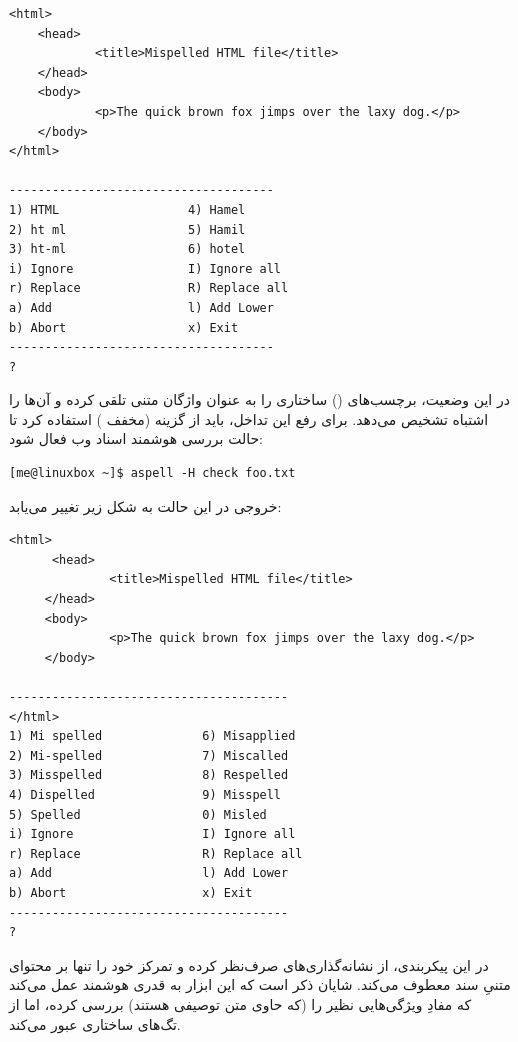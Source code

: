 \begin{latin}
\begin{lstlisting}
<html>
    <head>
            <title>Mispelled HTML file</title>
    </head>
    <body>
            <p>The quick brown fox jimps over the laxy dog.</p>
    </body>
</html>

-------------------------------------
1) HTML                  4) Hamel
2) ht ml                 5) Hamil
3) ht-ml                 6) hotel
i) Ignore                I) Ignore all
r) Replace               R) Replace all
a) Add                   l) Add Lower
b) Abort                 x) Exit
-------------------------------------
?
\end{lstlisting}
\end{latin}

در این وضعیت،  برچسب‌های () ساختاری  را به عنوان واژگان متنی تلقی کرده و آن‌ها را اشتباه تشخیص می‌دهد. برای رفع این تداخل، باید از گزینه  (مخفف ) استفاده کرد تا حالت بررسی هوشمند اسناد وب فعال شود:

\begin{latin}
\begin{lstlisting}
[me@linuxbox ~]$ aspell -H check foo.txt
\end{lstlisting}
\end{latin}

خروجی در این حالت به شکل زیر تغییر می‌یابد:

\begin{latin}
\begin{lstlisting}
<html>
      <head>
              <title>Mispelled HTML file</title>
     </head>
     <body>
              <p>The quick brown fox jimps over the laxy dog.</p>
     </body>

---------------------------------------
</html>
1) Mi spelled              6) Misapplied
2) Mi-spelled              7) Miscalled
3) Misspelled              8) Respelled
4) Dispelled               9) Misspell
5) Spelled                 0) Misled
i) Ignore                  I) Ignore all
r) Replace                 R) Replace all
a) Add                     l) Add Lower
b) Abort                   x) Exit
---------------------------------------
?
\end{lstlisting}
\end{latin}

در این پیکربندی،  از نشانه‌گذاری‌های  صرف‌نظر کرده و تمرکز خود را تنها بر محتوای متنیِ سند معطوف می‌کند. شایان ذکر است که این ابزار به قدری هوشمند عمل می‌کند که مفادِ ویژگی‌هایی نظیر  را (که حاوی متن توصیفی هستند) بررسی کرده، اما از تگ‌های ساختاری عبور می‌کند.


